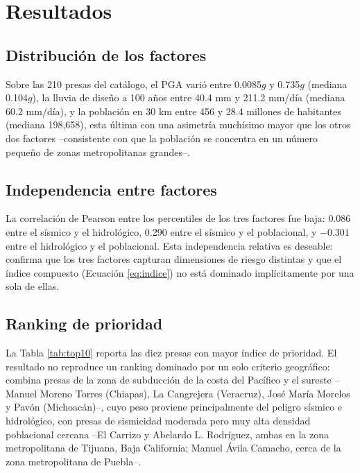 \section{Resultados}
\label{sec:resultados}

\subsection{Distribuci\'on de los factores}

Sobre las 210 presas del cat\'alogo, el PGA vari\'o entre 0.0085$g$ y 0.735$g$ (mediana 0.104$g$), la lluvia de dise\~no a 100 a\~nos entre 40.4 mm y 211.2 mm/d\'ia (mediana 60.2 mm/d\'ia), y la poblaci\'on en 30 km entre 456 y 28.4 millones de habitantes (mediana 198{,}658), esta \'ultima con una asimetr\'ia much\'isimo mayor que los otros dos factores --consistente con que la poblaci\'on se concentra en un n\'umero peque\~no de zonas metropolitanas grandes--.

\subsection{Independencia entre factores}

La correlaci\'on de Pearson entre los percentiles de los tres factores fue baja: 0.086 entre el s\'ismico y el hidrol\'ogico, 0.290 entre el s\'ismico y el poblacional, y $-0.301$ entre el hidrol\'ogico y el poblacional. Esta independencia relativa es deseable: confirma que los tres factores capturan dimensiones de riesgo distintas y que el \'indice compuesto (Ecuaci\'on \ref{eq:indice}) no est\'a dominado impl\'icitamente por una sola de ellas.

\subsection{Ranking de prioridad}

La Tabla \ref{tab:top10} reporta las diez presas con mayor \'indice de prioridad. El resultado no reproduce un ranking dominado por un solo criterio geogr\'afico: combina presas de la zona de subducci\'on de la costa del Pac\'ifico y el sureste --Manuel Moreno Torres (Chiapas), La Cangrejera (Veracruz), Jos\'e Mar\'ia Morelos y Pav\'on (Michoac\'an)--, cuyo peso proviene principalmente del peligro s\'ismico e hidrol\'ogico, con presas de sismicidad moderada pero muy alta densidad poblacional cercana --El Carrizo y Abelardo L. Rodr\'iguez, ambas en la zona metropolitana de Tijuana, Baja California; Manuel \'Avila Camacho, cerca de la zona metropolitana de Puebla--.

